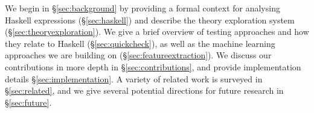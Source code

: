 We begin in \S \ref{sec:background} by providing a formal context for analysing Haskell expressions (\S \ref{sec:haskell}) and describe the \qspec{} theory exploration system (\S \ref{sec:theoryexploration}). We give a brief overview of testing approaches and how they relate to Haskell (\S \ref{sec:quickcheck}), as well as the machine learning approaches we are building on (\S \ref{sec:featureextraction}). We discuss our contributions in more depth in \S \ref{sec:contributions}, and provide implementation details \S \ref{sec:implementation}. A variety of related work is surveyed in \S \ref{sec:related}, and we give several potential directions for future research in \S \ref{sec:future}.

\iffalse TODO: Mention evaluation section? Seems to be missing. \fi

